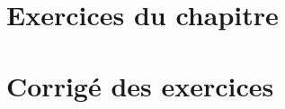 \newpage
\section*{Exercices du chapitre}


\exercice{}
\question

\newpage
\section*{Corrigé des exercices}





